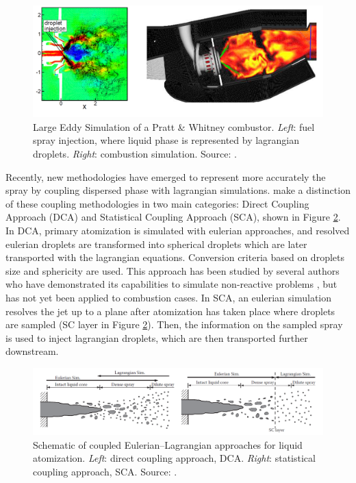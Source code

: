 \begin{figure}[h!]
	\centering
   \includegraphics[scale=0.45]{./part0_intro/reactive_LES_combustor_Moin}
	\caption[Large Eddy Simulation of a Pratt \& Whitney combustor.]{Large Eddy Simulation of a Pratt \& Whitney combustor. \textsl{Left}: fuel spray injection, where liquid phase is represented by lagrangian droplets. \textsl{Right}: combustion simulation. Source: .}
	\label{fig:reactive_LES_combustor_Moin}
\end{figure}

Recently, new methodologies have emerged to represent more accurately the spray by coupling dispersed phase with lagrangian simulations.  make a distinction of these coupling methodologies in two main categories: Direct Coupling Approach (DCA) and Statistical Coupling Approach (SCA), shown in Figure \ref{fig:coupled_EE_EL_approaches_Michaelides}. In DCA, primary atomization is simulated with eulerian approaches, and resolved eulerian droplets are transformed into spherical droplets which are later transported with the lagrangian equations. Conversion criteria based on droplets size and sphericity are used. This approach has been studied by several authors who have demonstrated its capabilities to simulate non-reactive problems , but has not yet been applied to combustion cases. In SCA, an eulerian simulation resolves the jet up to a plane after atomization has taken place where droplets are sampled (SC layer in Figure \ref{fig:coupled_EE_EL_approaches_Michaelides}). Then, the information on the sampled spray is used to inject lagrangian droplets, which are then transported further downstream.

\begin{figure}[h!]
	\centering
   \includegraphics[scale=0.5]{./part0_intro/coupled_EE_EL_approaches_Michaelides}
	\caption[Schematic of coupled Eulerian–Lagrangian approaches for liquid atomization.]{Schematic of coupled Eulerian–Lagrangian approaches for liquid atomization. \textsl{Left}: direct coupling approach, DCA. \textsl{Right}: statistical coupling approach, SCA. Source: .}
	\label{fig:coupled_EE_EL_approaches_Michaelides}
\end{figure}



